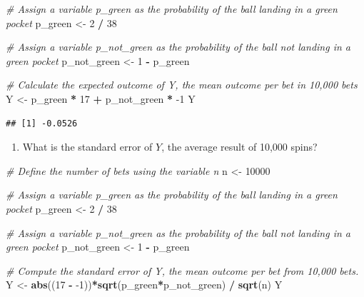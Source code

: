 \documentclass[
]{article}
\newenvironment{Shaded}{\begin{snugshade}}{\end{snugshade}}
\newcommand{\CommentTok}[1]{\textcolor[rgb]{0.56,0.35,0.01}{\textit{#1}}}
\newcommand{\DecValTok}[1]{\textcolor[rgb]{0.00,0.00,0.81}{#1}}
\newcommand{\KeywordTok}[1]{\textcolor[rgb]{0.13,0.29,0.53}{\textbf{#1}}}
\newcommand{\NormalTok}[1]{#1}
\newcommand{\OperatorTok}[1]{\textcolor[rgb]{0.81,0.36,0.00}{\textbf{#1}}}
\newcommand{\StringTok}[1]{\textcolor[rgb]{0.31,0.60,0.02}{#1}}
\providecommand{\tightlist}{%
  \setlength{\itemsep}{0pt}\setlength{\parskip}{0pt}}
\begin{document}
\begin{Shaded}
\begin{Highlighting}[]
\CommentTok{\# Assign a variable \textasciigrave{}p\_green\textasciigrave{} as the probability of the ball landing in a green pocket}
\NormalTok{p\_green \textless{}{-}}\StringTok{ }\DecValTok{2} \OperatorTok{/}\StringTok{ }\DecValTok{38}

\CommentTok{\# Assign a variable \textasciigrave{}p\_not\_green\textasciigrave{} as the probability of the ball not landing in a green pocket}
\NormalTok{p\_not\_green \textless{}{-}}\StringTok{ }\DecValTok{1} \OperatorTok{{-}}\StringTok{ }\NormalTok{p\_green}

\CommentTok{\# Calculate the expected outcome of \textasciigrave{}Y\textasciigrave{}, the mean outcome per bet in 10,000 bets}
\NormalTok{Y \textless{}{-}}\StringTok{ }\NormalTok{p\_green }\OperatorTok{*}\StringTok{ }\DecValTok{17} \OperatorTok{+}\StringTok{ }\NormalTok{p\_not\_green }\OperatorTok{*}\StringTok{ }\DecValTok{{-}1}
\NormalTok{Y}
\end{Highlighting}
\end{Shaded}

\begin{verbatim}
## [1] -0.0526
\end{verbatim}

\begin{enumerate}
\def\labelenumi{\arabic{enumi}.}
\setcounter{enumi}{6}
\tightlist
\item
  What is the standard error of \(Y\), the average result of 10,000
  spins?
\end{enumerate}

\begin{Shaded}
\begin{Highlighting}[]
\CommentTok{\# Define the number of bets using the variable \textquotesingle{}n\textquotesingle{}}
\NormalTok{n \textless{}{-}}\StringTok{ }\DecValTok{10000}

\CommentTok{\# Assign a variable \textasciigrave{}p\_green\textasciigrave{} as the probability of the ball landing in a green pocket}
\NormalTok{p\_green \textless{}{-}}\StringTok{ }\DecValTok{2} \OperatorTok{/}\StringTok{ }\DecValTok{38}

\CommentTok{\# Assign a variable \textasciigrave{}p\_not\_green\textasciigrave{} as the probability of the ball not landing in a green pocket}
\NormalTok{p\_not\_green \textless{}{-}}\StringTok{ }\DecValTok{1} \OperatorTok{{-}}\StringTok{ }\NormalTok{p\_green}

\CommentTok{\# Compute the standard error of \textquotesingle{}Y\textquotesingle{}, the mean outcome per bet from 10,000 bets.}
\NormalTok{Y \textless{}{-}}\StringTok{ }\KeywordTok{abs}\NormalTok{((}\DecValTok{17} \OperatorTok{{-}}\StringTok{ }\DecValTok{{-}1}\NormalTok{))}\OperatorTok{*}\KeywordTok{sqrt}\NormalTok{(p\_green}\OperatorTok{*}\NormalTok{p\_not\_green) }\OperatorTok{/}\StringTok{ }\KeywordTok{sqrt}\NormalTok{(n)}
\NormalTok{Y}
\end{Highlighting}
\end{Shaded}
\end{document}
